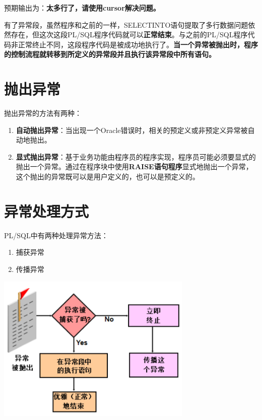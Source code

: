 \documentclass[11pt, a4paper, oneside, UTF8]{ctexbook}
\let\kaishu\relax %
\begin{document}
预期输出为：{\bfseries\kaishu 太多行了，请使用cursor解决问题。}

有了异常段，虽然程序和之前的一样，SELECTINTO语句提取了多行数据问题依然存在，但这次这段PL/SQL程序代码就可以{\bfseries\kaishu 正常结束}。与之前的PL/SQL程序代码非正常终止不同，这段程序代码是被成功地执行了。\textbf{当一个异常被抛出时，程序的控制流程就转移到所定义的异常段并且执行该异常段中所有语句。}
\section{抛出异常}
抛出异常的方法有两种：
\begin{enumerate}
  \item {\bfseries\kaishu 自动抛出异常}：当出现一个Oracle错误时，相关的预定义或非预定义异常被自动地抛出。
  \item {\bfseries\kaishu 显式抛出异常}：基于业务功能由程序员的程序实现，程序员可能必须要显式的抛出一个异常。通过在程序块中使用{\bfseries\kaishu RAISE语句程序}显式地抛出一个异常，这个抛出的异常既可以是用户定义的，也可以是预定义的。
\end{enumerate}
\section{异常处理方式}
PL/SQL中有两种处理异常方法：
\begin{enumerate}
  \item 捕获异常
  \item 传播异常
\end{enumerate}
\begin{center}
  \begin{minipage}{\textwidth}
    \center
    \includegraphics[width=0.7\textwidth]{picture/异常处理方式.png}
    \captionsetup{hypcap=false}
    \label{fig:异常处理方式}
  \end{minipage}
\end{center}
\end{document}
